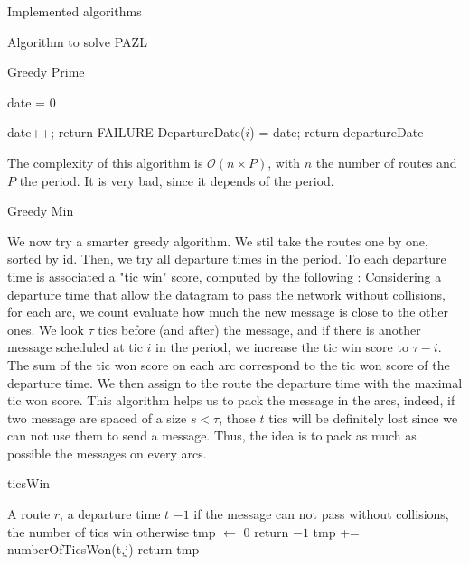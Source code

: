 \documentclass[10pt]{article}
\begin{document}
\begin{section}{Implemented algorithms}
\begin{subsection}{Algorithm to solve PAZL }
\begin{subsubsection}{Greedy Prime}
\begin{algorithm}[H]
\begin{algorithmic}
	\STATE date = $0$
	
 	
 	\STATE date++;
	\STATE return FAILURE
	\ENDIF
 	\ENDWHILE
	\STATE DepartureDate($i$) = date;
 	\ENDFOR
	\STATE return departureDate
 	\end{algorithmic}
 	\end{algorithm}
 	The complexity of this algorithm is $\mathcal{O}(n\times P)$, with $n$ the number of routes and $P$ the period. It is very bad, since it depends of the period.
  \end{subsubsection}
    \begin{subsubsection}{Greedy Min}
  
  We now try a smarter greedy algorithm. We stil take the routes one by one, sorted by id. Then, we try all departure times in the period. To each departure time is associated a "tic win" score, computed by the following : Considering a departure time that allow the datagram to pass the network without collisions, for each arc, we count evaluate how much the new message is close to the other ones. We look $\tau$ tics before (and after) the message, and if there is another message scheduled at tic $i$ in the period, we increase the tic win score to $\tau -i$.
  The sum of the tic won score on each arc correspond to the tic won score of the departure time. We then assign to the route the departure time with the maximal tic won score.
  This algorithm helps us to pack the message in the arcs, indeed, if two message are spaced of a size $s < \tau$, those $t$ tics will be definitely lost since we can not use them to send a message. Thus, the idea is to pack as much as possible the messages on every arcs.
  
 
    	\begin{algorithm}[H]
 	\caption{ticsWin}
	\label{algo:ticswin}
 	\begin{algorithmic}
 	\REQUIRE A route $r$, a departure time $t$
	\ENSURE $-1$ if the message can not pass without collisions, the number of tics win otherwise
	\STATE tmp  $\leftarrow$ $0$
 	\STATE return $-1$
	\ELSE
	\STATE tmp += numberOfTicsWon(t,j)
 	\ENDIF
 	\ENDFOR
	\STATE return tmp
 	\end{algorithmic}
 	\end{algorithm}


\end{subsubsection}
\end{subsection}
\end{section}
\end{document}
